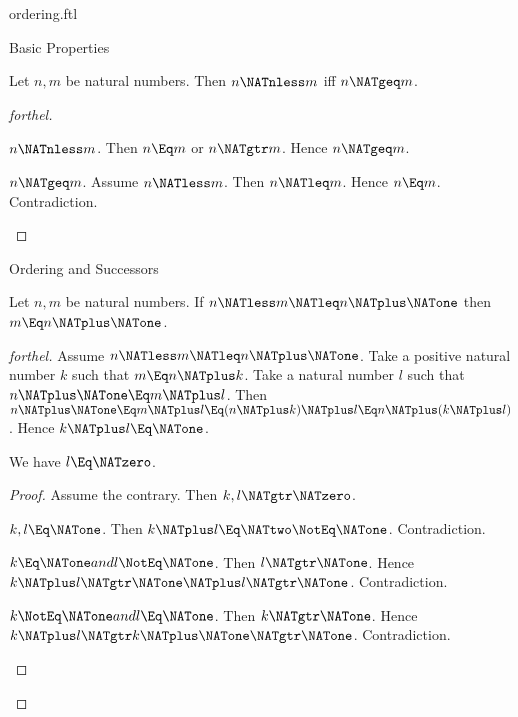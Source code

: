 \documentclass{stex}
\begin{document}
\begin{smodule}{ordering.ftl}
\begin{sfragment}{Basic Properties}
  \begin{proposition}[forthel]
    Let $n, m$ be natural numbers.
    Then $n \NATnless m$ iff $n \NATgeq m$.
  \end{proposition}
  \begin{proof}[forthel]
    \begin{case}{$n \NATnless m$.}
      Then $n \Eq m$ or $n \NATgtr m$.
      Hence $n \NATgeq m$.
    \end{case}

    \begin{case}{$n \NATgeq m$.}
      Assume $n \NATless m$.
      Then $n \NATleq m$.
      Hence $n \Eq m$.
      Contradiction.
    \end{case}
  \end{proof}
\end{sfragment}

\begin{sfragment}{Ordering and Successors}
  \begin{proposition}[forthel]
    Let $n, m$ be natural numbers.
    If $n \NATless m \NATleq n \NATplus \NATone$ then $m \Eq n \NATplus \NATone$.
  \end{proposition}
  \begin{proof}[forthel]
    Assume $n \NATless m \NATleq n \NATplus \NATone$.
    Take a positive natural number $k$ such that $m \Eq n \NATplus k$.
    Take a natural number $l$ such that $n \NATplus \NATone \Eq m \NATplus l$.
    Then $n \NATplus \NATone
      \Eq m \NATplus l
      \Eq (n \NATplus k) \NATplus l
      \Eq n \NATplus (k \NATplus l)$.
    Hence $k \NATplus l \Eq \NATone$.

    We have $l \Eq \NATzero$.
    \begin{proof}
      Assume the contrary.
      Then $k,l \NATgtr \NATzero$.

      \begin{case}{$k,l \Eq \NATone$.}
        Then $k \NATplus l
          \Eq \NATtwo
          \NotEq \NATone$.
        Contradiction.
      \end{case}

      \begin{case}{$k \Eq \NATone and l \NotEq \NATone$.}
        Then $l \NATgtr \NATone$.
        Hence $k \NATplus l
          \NATgtr \NATone \NATplus l
          \NATgtr \NATone$.
        Contradiction.
      \end{case}

      \begin{case}{$k \NotEq \NATone and l \Eq \NATone$.}
        Then $k \NATgtr \NATone$.
        Hence $k \NATplus l
          \NATgtr k \NATplus \NATone
          \NATgtr \NATone$.
        Contradiction.
      \end{case}


\end{proof}
\end{proof}
\end{sfragment}
\end{smodule}
\end{document}
